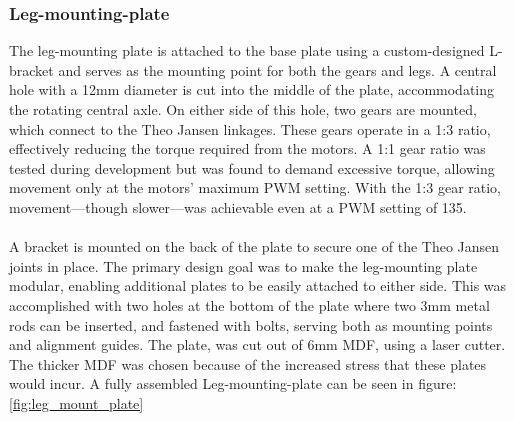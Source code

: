 \subsubsection{Leg-mounting-plate}
The leg-mounting plate is attached to the base plate using a custom-designed L-bracket and serves as the mounting point for both the gears and legs. A central hole with a 12mm diameter is cut into the middle of the plate, accommodating the rotating central axle. On either side of this hole, two gears are mounted, which connect to the Theo Jansen linkages. These gears operate in a 1:3 ratio, effectively reducing the torque required from the motors. A 1:1 gear ratio was tested during development but was found to demand excessive torque, allowing movement only at the motors' maximum PWM setting. With the 1:3 gear ratio, movement—though slower—was achievable even at a PWM setting of 135.
\\ \\
A bracket is mounted on the back of the plate to secure one of the Theo Jansen joints in place. The primary design goal was to make the leg-mounting plate modular, enabling additional plates to be easily attached to either side. This was accomplished with two holes at the bottom of the plate where two 3mm metal rods can be inserted, and fastened with bolts, serving both as mounting points and alignment guides. The plate, was cut out of 6mm MDF, using a laser cutter. The thicker MDF was chosen because of the increased stress that these plates would incur. A fully assembled Leg-mounting-plate can be seen in figure: \ref{fig:leg_mount_plate}
\\
